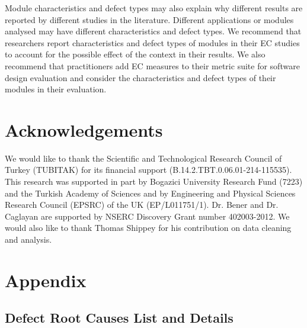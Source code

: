 \documentclass[times]{smrauth}
\begin{document}
Module characteristics and defect types may also explain why different results are reported by different studies in the literature. Different applications or modules analysed may have different characteristics and defect types. We recommend that researchers report characteristics and defect types of modules in their EC studies to account for the possible effect of the context in their results. We also recommend that practitioners add EC measures to their metric suite for software design evaluation and consider the characteristics and defect types of their modules in their evaluation. 

\section{Acknowledgements}
We would like to thank the Scientific and Technological Research Council of Turkey (TUBITAK) for its financial support (B.14.2.TBT.0.06.01-214-115535). This research was supported in part by Bogazici University Research Fund (7223) and the Turkish Academy of Sciences and by Engineering and Physical Sciences Research Council (EPSRC) of the UK (EP/L011751/1). Dr. Bener and Dr. Caglayan are supported by NSERC Discovery Grant number 402003-2012. We would also like to thank Thomas Shippey for his contribution on data cleaning and analysis.




%

%
%





\newpage
\section{Appendix}

\subsection{Defect Root Causes List and Details}
\end{document}
